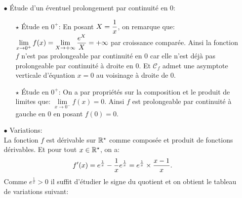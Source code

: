 \documentclass[a4paper, 11pt,reqno]{article}
\begin{document}
\begin{correction}
\begin{enumerate}
\begin{itemize}
\begin{itemize}
				            \item[$\star$] La droite d'\'equation $y=x+1$ est asymptote oblique \`a la courbe au voisinage de $-\infty$ et de $+\infty$.
				            \item[$\star$] La courbe est en-dessous de cette asymptote au voisinage de $-\infty$ et elle est au-dessus de cette asymptote au voisinage de $+\infty$.
			            \end{itemize}
			      \item[$\bullet$] \'Etude d'un \'eventuel prolongement par continuit\'e en 0:
			            \begin{itemize}
				            \item[$\star$] \'Etude en $0^+$: En posant $X=\displaystyle\frac{1}{x}$, on remarque que: $\lim\limits_{x\to 0^+} f(x)=\lim\limits_{X\to +\infty} \displaystyle\frac{e^X}{X}=+\infty$ par croissance compar\'ee. Ainsi la fonction $f$ n'est pas prolongeable par continuit\'e en 0 car elle n'est d\'ej\`{a} pas prolongeable par continuit\'e \`{a} droite en 0. Et $\mathcal{C}_f$ admet une asymptote verticale d'\'equation $x=0$ au voisinage \`{a} droite de 0.
				            \item[$\star$] \'Etude en $0^+$: On a par propri\'et\'es sur la composition et le produit de limites que: $\lim\limits_{x\to 0^-} f(x)=0$. Ainsi $f$ est prolongeable par continuit\'e \`{a} gauche en 0 en posant $f(0)=0$.
			            \end{itemize}
			      \item[$\bullet$] Variations:\\
			            \noindent La fonction $f$ est d\'erivable sur $\mathbb{R}^{\star}$ comme compos\'ee et produit de fonctions d\'erivables. Et pour tout $x\in\mathbb{R}^{\star}$, on a:
			            $$f^{\prime}(x)=e^{\frac{1}{x}}-\displaystyle\frac{1}{x}e^{\frac{1}{x}}=e^{\frac{1}{x}} \times \displaystyle\frac{x-1}{x}.$$
			            Comme $e^{\frac{1}{x}}>0$ il suffit d'\'etudier le signe du quotient et on obtient le tableau de variations suivant:
			            \begin{center}
\end{center}
\end{itemize}
\end{enumerate}
\end{correction}
\end{document}

